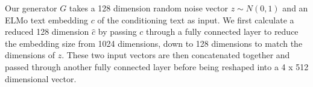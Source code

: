 Our generator $G$ takes a 128 dimension random noise vector $z \sim N(0, 1)$ and an ELMo text embedding $c$ of the conditioning text as input. We first calculate a reduced 128 dimension  $\hat{c}$ by passing $c$ through a fully connected layer to reduce the embedding size from 1024 dimensions, down to 128 dimensions to match the dimensions of $z$. These two input vectors are then concatenated together and passed through another fully connected layer before being reshaped into a 4 x 512 dimensional vector.